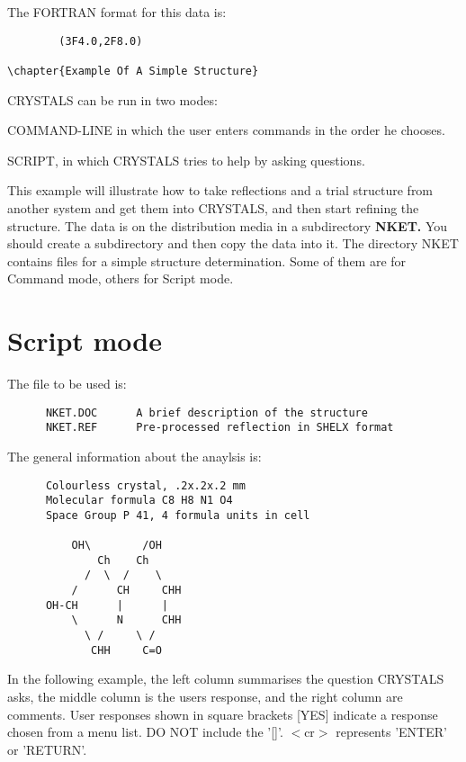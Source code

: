 \documentclass[10pt,a4paper]{report}
\begin{document}
The FORTRAN format for this data is:

\small\begin{verbatim}        (3F4.0,2F8.0)

\chapter{Example Of A Simple Structure}
\end{verbatim}\normalsize



CRYSTALS can be run in two modes:

COMMAND-LINE in which the user enters commands in the order he chooses.

SCRIPT, in which CRYSTALS tries to help by asking questions.



This example will illustrate how to take reflections and a trial structure from another system and get them into CRYSTALS, and then start  refining the structure. The data is on the distribution media in a subdirectory {\bf NKET.} You should  create a subdirectory and then copy the data into it. The directory NKET contains files for a simple structure determination. Some of them are for Command mode, others for Script mode.\section{Script mode}


The file to be used is:
\small\begin{verbatim}
      NKET.DOC      A brief description of the structure
      NKET.REF      Pre-processed reflection in SHELX format
\end{verbatim}\normalsize

The general information about the anaylsis is:
\small\begin{verbatim}
      Colourless crystal, .2x.2x.2 mm
      Molecular formula C8 H8 N1 O4
      Space Group P 41, 4 formula units in cell

          OH\        /OH
              Ch    Ch
            /  \  /    \
          /      CH     CHH
      OH-CH      |      |
          \      N      CHH
            \ /     \ /
             CHH     C=O

\end{verbatim}\normalsize

In the following example, the left column summarises the question
CRYSTALS asks, the middle column is the users response, and the right
column are comments. User responses shown in square brackets [YES]
indicate a response chosen from a menu list. DO NOT include the '[]'. $<$cr$>$
represents 'ENTER' or 'RETURN'.
\end{document}
